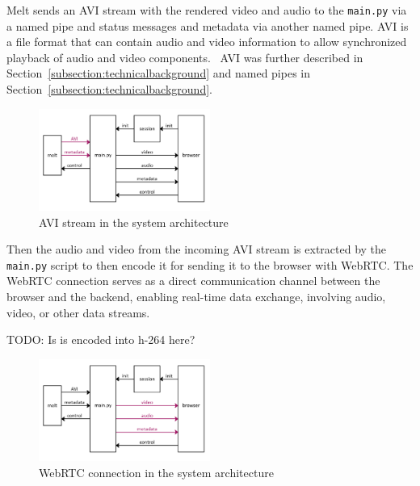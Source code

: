 \documentclass[../MasterThesis.tex]{subfiles}
\begin{document}
Melt sends an AVI stream with the rendered video and audio to the \texttt{main.py} via a named pipe and status messages and metadata via another named pipe.
AVI is a file format that can contain audio and video information to allow synchronized playback of audio and video components.~\cite{avi} AVI was further described in Section~\ref{subsection:technicalbackground} and named pipes in Section~\ref{subsection:technicalbackground}.

\begin{figure}[H]
	\centering
	\includegraphics[width=0.5\textwidth]{IM_avi.png}
	\caption{AVI stream in the system architecture}
\end{figure}


Then the audio and video from the incoming AVI stream is extracted by the \texttt{main.py} script to then encode it for sending it to the browser with WebRTC. The WebRTC connection serves as a direct communication channel between the browser and the backend, enabling real-time data exchange, involving audio, video, or other data streams. 

TODO: Is is encoded into h-264 here?

%

\begin{figure}[H]
	\centering
	\includegraphics[width=0.5\textwidth]{IM_wrtc.png}
	\caption{WebRTC connection in the system architecture}
\end{figure}
\end{document}
